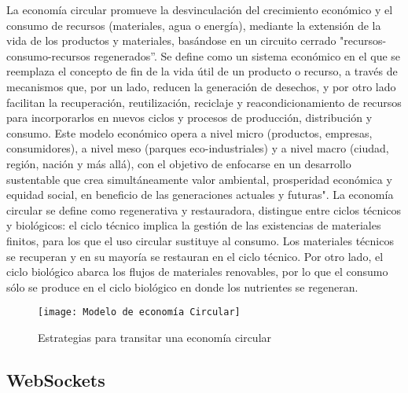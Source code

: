 \documentclass[]{article}
\begin{document}
La economía circular promueve la desvinculación del crecimiento económico y el consumo de recursos (materiales, agua o energía), mediante la extensión de la vida de los productos y materiales, basándose en un circuito cerrado "recursos-consumo-recursos regenerados”. Se define como un sistema económico en el que se reemplaza el concepto de fin de la vida útil de un producto o recurso, a través de mecanismos que, por un lado, reducen la generación de desechos, y por otro lado facilitan la recuperación, reutilización, reciclaje y reacondicionamiento de recursos para incorporarlos en nuevos ciclos y procesos de producción, distribución y consumo. Este modelo económico opera a nivel micro (productos, empresas, consumidores), a nivel meso (parques eco-industriales) y a nivel macro (ciudad, región, nación y más allá), con el objetivo de enfocarse en un desarrollo sustentable que crea simultáneamente valor ambiental, prosperidad económica y equidad social, en beneficio de las generaciones actuales y futuras"\cite{cruz2019economia}.
La economía circular se define como regenerativa y restauradora, distingue entre ciclos técnicos y biológicos: el ciclo técnico implica la gestión de las existencias de materiales finitos, para los que el uso circular sustituye al consumo. Los materiales técnicos se recuperan y en su mayoría se restauran en el ciclo técnico. Por otro lado, el ciclo biológico abarca los flujos de materiales renovables, por lo que el consumo sólo se produce en el ciclo biológico en donde los nutrientes se regeneran\cite{INECC2021EC}.

\begin{figure}[ht]
	\centering
	\texttt{[image: Modelo de economía Circular]}%
	\caption{Estrategias para transitar una economía circular\cite{PROFECO2019EC}}%
	\label{b:modelo circular}%
\end{figure}

\subsection{WebSockets}
\end{document}
